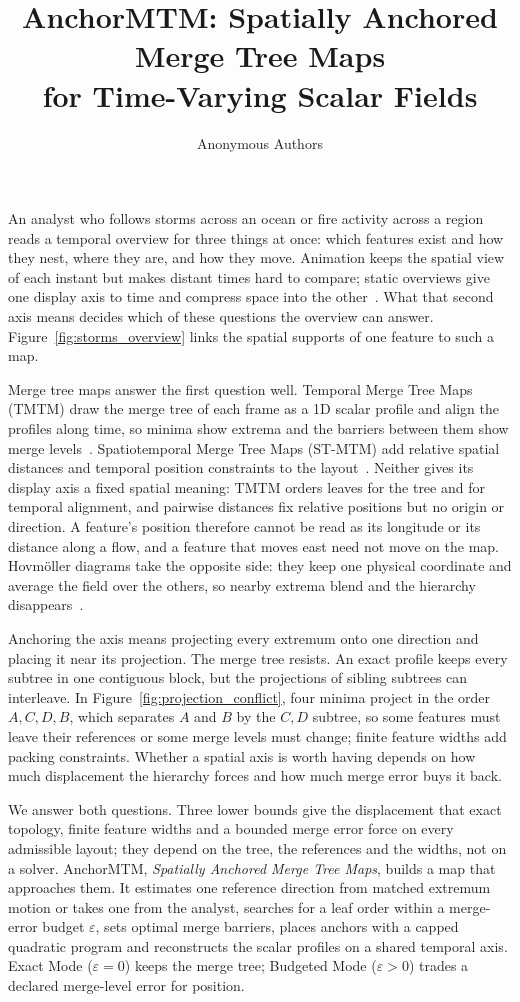 \documentclass[review]{vgtc}
\title{AnchorMTM: Spatially Anchored Merge Tree Maps\\for Time-Varying Scalar Fields}
\author{Anonymous Authors}
\begin{document}
\maketitle
\raggedbottom
\setlength{\emergencystretch}{1.5em}
An analyst who follows storms across an ocean or fire activity across a region reads a temporal overview for three things at once: which features exist and how they nest, where they are, and how they move. Animation keeps the spatial view of each instant but makes distant times hard to compare; static overviews give one display axis to time and compress space into the other~\cite{Tversky:2002:Animation,Robertson:2008:Animation,Bach:2017:STC}. What that second axis means decides which of these questions the overview can answer. Figure~\ref{fig:storms_overview} links the spatial supports of one feature to such a map.

Merge tree maps answer the first question well. Temporal Merge Tree Maps (TMTM) draw the merge tree of each frame as a 1D scalar profile and align the profiles along time, so minima show extrema and the barriers between them show merge levels~\cite{Koepp:2023:TMTM}. Spatiotemporal Merge Tree Maps (ST-MTM) add relative spatial distances and temporal position constraints to the layout~\cite{STMTM:2026}. Neither gives its display axis a fixed spatial meaning: TMTM orders leaves for the tree and for temporal alignment, and pairwise distances fix relative positions but no origin or direction. A feature's position therefore cannot be read as its longitude or its distance along a flow, and a feature that moves east need not move on the map. Hovm\"oller diagrams take the opposite side: they keep one physical coordinate and average the field over the others, so nearby extrema blend and the hierarchy disappears~\cite{Hovmoller:1949}.

Anchoring the axis means projecting every extremum onto one direction and placing it near its projection. The merge tree resists. An exact profile keeps every subtree in one contiguous block, but the projections of sibling subtrees can interleave. In Figure~\ref{fig:projection_conflict}, four minima project in the order $A,C,D,B$, which separates $A$ and $B$ by the $C,D$ subtree, so some features must leave their references or some merge levels must change; finite feature widths add packing constraints. Whether a spatial axis is worth having depends on how much displacement the hierarchy forces and how much merge error buys it back.

We answer both questions. Three lower bounds give the displacement that exact topology, finite feature widths and a bounded merge error force on every admissible layout; they depend on the tree, the references and the widths, not on a solver. AnchorMTM, \emph{Spatially Anchored Merge Tree Maps}, builds a map that approaches them. It estimates one reference direction from matched extremum motion or takes one from the analyst, searches for a leaf order within a merge-error budget $\varepsilon$, sets optimal merge barriers, places anchors with a capped quadratic program and reconstructs the scalar profiles on a shared temporal axis. Exact Mode ($\varepsilon=0$) keeps the merge tree; Budgeted Mode ($\varepsilon>0$) trades a declared merge-level error for position.
\end{document}
